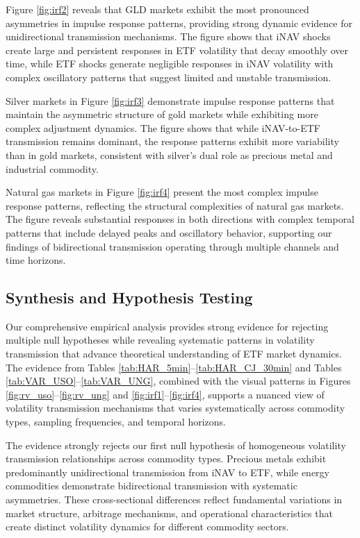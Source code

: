 Figure \ref{fig:irf2} reveals that GLD markets exhibit the most pronounced asymmetries in impulse response patterns, providing strong dynamic evidence for unidirectional transmission mechanisms. The figure shows that iNAV shocks create large and persistent responses in ETF volatility that decay smoothly over time, while ETF shocks generate negligible responses in iNAV volatility with complex oscillatory patterns that suggest limited and unstable transmission.

Silver markets in Figure \ref{fig:irf3} demonstrate impulse response patterns that maintain the asymmetric structure of gold markets while exhibiting more complex adjustment dynamics. The figure shows that while iNAV-to-ETF transmission remains dominant, the response patterns exhibit more variability than in gold markets, consistent with silver's dual role as precious metal and industrial commodity.

Natural gas markets in Figure \ref{fig:irf4} present the most complex impulse response patterns, reflecting the structural complexities of natural gas markets. The figure reveals substantial responses in both directions with complex temporal patterns that include delayed peaks and oscillatory behavior, supporting our findings of bidirectional transmission operating through multiple channels and time horizons.

\subsection{Synthesis and Hypothesis Testing}

Our comprehensive empirical analysis provides strong evidence for rejecting multiple null hypotheses while revealing systematic patterns in volatility transmission that advance theoretical understanding of ETF market dynamics. The evidence from Tables \ref{tab:HAR_5min}--\ref{tab:HAR_CJ_30min} and Tables \ref{tab:VAR_USO}--\ref{tab:VAR_UNG}, combined with the visual patterns in Figures \ref{fig:rv_uso}--\ref{fig:rv_ung} and \ref{fig:irf1}--\ref{fig:irf4}, supports a nuanced view of volatility transmission mechanisms that varies systematically across commodity types, sampling frequencies, and temporal horizons.

The evidence strongly rejects our first null hypothesis of homogeneous volatility transmission relationships across commodity types. Precious metals exhibit predominantly unidirectional transmission from iNAV to ETF, while energy commodities demonstrate bidirectional transmission with systematic asymmetries. These cross-sectional differences reflect fundamental variations in market structure, arbitrage mechanisms, and operational characteristics that create distinct volatility dynamics for different commodity sectors.

